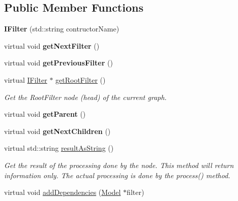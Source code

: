 \subsection*{Public Member Functions}
\begin{DoxyCompactItemize}
\item 
\mbox{\label{classfilter_1_1_i_filter_acc2eda7686fb753d4fdc76d7c7cb7fe9}} 
{\bfseries I\+Filter} (std\+::string contructor\+Name)
\item 
\mbox{\label{classfilter_1_1_i_filter_a1ba2261bc75ed3e23ec9b14fd78661de}} 
virtual void {\bfseries get\+Next\+Filter} ()
\item 
\mbox{\label{classfilter_1_1_i_filter_a46f7e69f03ccf1d3227dddcb2ff5edd7}} 
virtual void {\bfseries get\+Previous\+Filter} ()
\item 
virtual \hyperlink{classfilter_1_1_i_filter}{I\+Filter} $\ast$ \hyperlink{classfilter_1_1_i_filter_a97fdc1892c15c918287c83263d069147}{get\+Root\+Filter} ()
\begin{DoxyCompactList}\small\item\em Get the Root\+Filter node (head) of the current graph. \end{DoxyCompactList}\item 
\mbox{\label{classfilter_1_1_i_filter_ab4a3bdc9a1e04edd8f1cedb2fc51b234}} 
virtual void {\bfseries get\+Parent} ()
\item 
\mbox{\label{classfilter_1_1_i_filter_a9c6127d9371057896377e07c73fe9de2}} 
virtual void {\bfseries get\+Next\+Children} ()
\item 
virtual std\+::string \hyperlink{classfilter_1_1_i_filter_ab99902b060a6d9edc3452a8c9f85e37e}{result\+As\+String} ()
\begin{DoxyCompactList}\small\item\em Get the result of the processing done by the node. This method will return information only. The actual processing is done by the process() method. \end{DoxyCompactList}\item 
virtual void \hyperlink{classfilter_1_1_i_filter_a3132d332ce814fda5c1a17a3e498c4fb}{add\+Dependencies} (\hyperlink{classfilter_1_1_model}{Model} $\ast$filter)

\end{DoxyCompactItemize}
